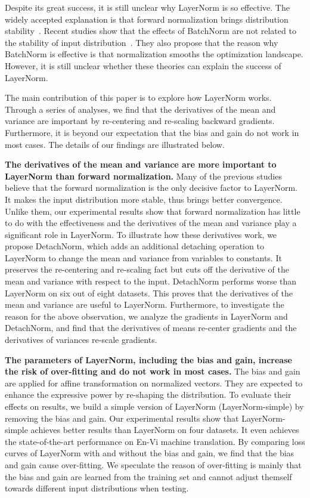 \documentclass{article}
\begin{document}
Despite its great success, it is still unclear why LayerNorm is so effective. 
The widely accepted explanation is that forward normalization brings distribution stability~\citep{ioffe2015batch, lei2016layer}. Recent studies show that the effects of BatchNorm are not related to the stability of input distribution~\citep{zhang2016understanding,santurkar2018does}. 
They also propose that the reason why BatchNorm is effective is that normalization smooths the optimization landscape. 
However, it is still unclear whether these theories can explain the success of LayerNorm. 


The main contribution of this paper is to explore how LayerNorm works.
Through a series of analyses, we find that the derivatives of the mean and variance are important by re-centering and re-scaling backward gradients. Furthermore, it is beyond our expectation that the bias and gain do not work in most cases. The details of our findings are illustrated below.


\textbf{The derivatives of the mean and variance are more important to LayerNorm than forward normalization.} Many of the previous studies believe that the forward normalization is the only decisive factor to LayerNorm. It makes the input distribution more stable, thus brings better convergence. Unlike them, our experimental results show that forward normalization has little to do with the effectiveness and  the derivatives of the mean and variance play a significant role in LayerNorm. To illustrate how these derivatives work, we propose DetachNorm, which adds an additional detaching operation to LayerNorm to change the mean and variance from variables to constants.
It preserves the re-centering and re-scaling fact but cuts off the derivative of the mean and variance with respect to the input.
DetachNorm performs worse than LayerNorm on six out of eight datasets.
This proves that the derivatives of the mean and variance are useful to LayerNorm. 
Furthermore, to investigate the reason for the above observation, we analyze the gradients in LayerNorm and DetachNorm, and find that the derivatives of means re-center gradients and the derivatives of variances re-scale gradients.
 

\textbf{The parameters of LayerNorm, including the bias and gain, increase the risk of over-fitting and do not work in most cases.} The bias and gain are applied for affine transformation on normalized vectors. They are expected to enhance the expressive power by re-shaping the distribution.  To evaluate their effects on results, we build a simple version of LayerNorm (LayerNorm-simple) by removing the bias and gain.
Our experimental results show that LayerNorm-simple achieves better results than LayerNorm on four datasets. It even achieves the state-of-the-art performance on En-Vi machine translation.   By comparing loss curves of LayerNorm with and without the bias and gain, we find that the bias and gain cause over-fitting. 
We speculate the reason of over-fitting is mainly that the bias and gain are learned from the training set and cannot adjust themself towards different input distributions when testing.
\end{document}

